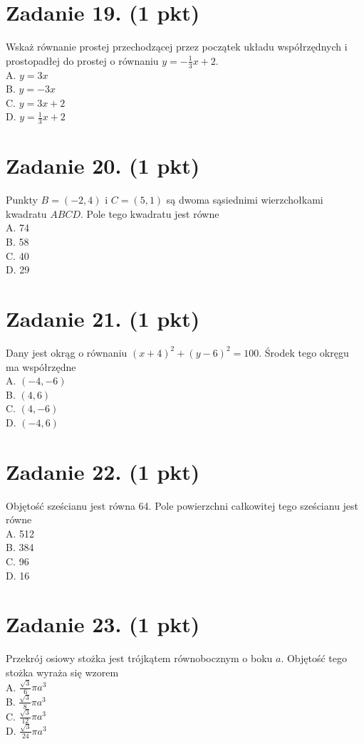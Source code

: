 \documentclass[10pt]{article}
\begin{document}
\section*{Zadanie 19. (1 pkt)}
Wskaż równanie prostej przechodzącej przez początek układu współrzędnych i prostopadłej do prostej o równaniu \(y=-\frac{1}{3} x+2\).\\
A. \(y=3 x\)\\
B. \(y=-3 x\)\\
C. \(y=3 x+2\)\\
D. \(y=\frac{1}{3} x+2\)

\section*{Zadanie 20. (1 pkt)}
Punkty \(B=(-2,4)\) i \(C=(5,1)\) są dwoma sąsiednimi wierzchołkami kwadratu \(A B C D\). Pole tego kwadratu jest równe\\
A. 74\\
B. 58\\
C. 40\\
D. 29

\section*{Zadanie 21. (1 pkt)}
Dany jest okrąg o równaniu \((x+4)^{2}+(y-6)^{2}=100\). Środek tego okręgu ma współrzędne\\
A. \((-4,-6)\)\\
B. \((4,6)\)\\
C. \((4,-6)\)\\
D. \((-4,6)\)

\section*{Zadanie 22. (1 pkt)}
Objętość sześcianu jest równa 64. Pole powierzchni całkowitej tego sześcianu jest równe\\
A. 512\\
B. 384\\
C. 96\\
D. 16

\section*{Zadanie 23. (1 pkt)}
Przekrój osiowy stożka jest trójkątem równobocznym o boku \(a\). Objętość tego stożka wyraża się wzorem\\
A. \(\frac{\sqrt{3}}{6} \pi a^{3}\)\\
B. \(\frac{\sqrt{3}}{8} \pi a^{3}\)\\
C. \(\frac{\sqrt{3}}{12} \pi a^{3}\)\\
D. \(\frac{\sqrt{3}}{24} \pi a^{3}\)
\end{document}
